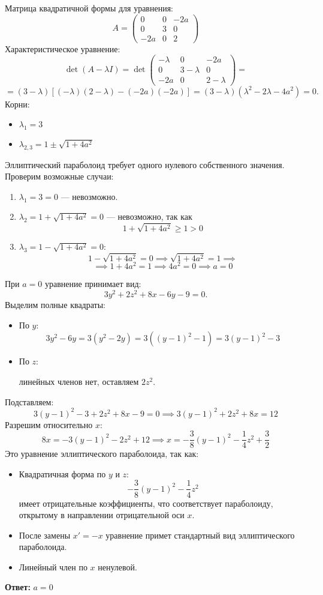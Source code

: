 \documentclass[a4paper]{article}
\renewcommand{\geq}{\geqslant}
\begin{document}
\begin{enumerate}
  Матрица квадратичной формы для уравнения:
  \[
  A = \begin{pmatrix}
  0 & 0 & -2a \\
  0 & 3 & 0 \\
  -2a & 0 & 2
  \end{pmatrix}
  \]
  Характеристическое уравнение:
  \[
  \det(A - \lambda I) = \det \begin{pmatrix}
  -\lambda & 0 & -2a \\
  0 & 3-\lambda & 0 \\
  -2a & 0 & 2-\lambda
  \end{pmatrix} = \]
  \[=(3 - \lambda) \left[ (-\lambda)(2 - \lambda) -
   (-2a)(-2a) \right] = (3 - \lambda)(\lambda^2 - 2\lambda - 4a^2) = 0.
  \]
  Корни:
  \begin{itemize}
    \item \(\lambda_1 = 3\)
    \item \(\lambda_{2,3} = 1 \pm \sqrt{1 + 4a^2}\)
  \end{itemize}

  Эллиптический параболоид требует одного нулевого собственного значения. Проверим возможные случаи:
  \begin{enumerate}
  \item \(\lambda_1 = 3 = 0\) — невозможно.
  \item \(\lambda_2 = 1 + \sqrt{1 + 4a^2} = 0\) — невозможно, так как
   \[1 + \sqrt{1 + 4a^2} \geq 1 > 0\]
  \item \(\lambda_3 = 1 - \sqrt{1 + 4a^2} = 0\):
    \[
    1 - \sqrt{1 + 4a^2} = 0 \implies \sqrt{1 + 4a^2} = 1 \implies \]
    \[
    \implies 1 + 4a^2 = 1 \implies 4a^2 = 0 \implies a = 0
    \]
  \end{enumerate}

  При \(a = 0\) уравнение принимает вид:
  \[
  3y^2 + 2z^2 + 8x - 6y - 9 = 0.
  \]
  Выделим полные квадраты:
  \begin{itemize} 
    \item По \(y\): \[3y^2 - 6y = 3(y^2 - 2y) = 3((y - 1)^2 - 1) = 3(y - 1)^2 - 3\]
    \item По \(z\): 
    
    линейных членов нет, оставляем \(2z^2\).
  \end{itemize}
  Подставляем:
  \[
  3(y - 1)^2 - 3 + 2z^2 + 8x - 9 = 0 \implies 3(y - 1)^2 + 2z^2 + 8x = 12
  \]
  Разрешим относительно \(x\):
  \[
  8x = -3(y - 1)^2 - 2z^2 + 12 \implies x = -\frac{3}{8}(y - 1)^2 -
   \frac{1}{4}z^2 + \frac{3}{2}
  \]
  Это уравнение эллиптического параболоида, так как:
  \begin{itemize}
    \item Квадратичная форма по \(y\) и \(z\): 
    \[-\frac{3}{8}(y - 1)^2 - \frac{1}{4}z^2\] 
    имеет отрицательные коэффициенты, что соответствует параболоиду, открытому в
     направлении отрицательной оси \(x\).
    \item После замены \(x' = -x\) уравнение примет стандартный вид
     эллиптического параболоида.
    \item Линейный член по \(x\) ненулевой.
  \end{itemize}

  \textbf{Ответ: } $a = 0$

\end{enumerate}
\end{document}
